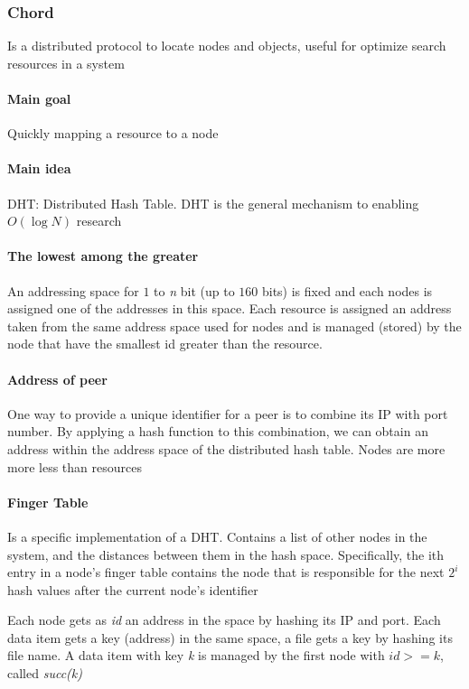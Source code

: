 \subsubsection{Chord}
Is a distributed protocol to locate nodes and objects, useful for optimize search resources in a system

\paragraph{Main goal}
Quickly mapping a resource to a node

\paragraph{Main idea}
DHT: Distributed Hash Table. DHT is the general mechanism to enabling $O(\log N)$ research

\paragraph{The lowest among the greater}
An addressing space for $1$ to \textit{n} bit (up to $160$ bits) is fixed and each nodes is assigned one of the addresses in this space. Each resource is assigned an address taken from the same address space used for nodes and is managed (stored) by the node that have the smallest id greater than the resource.

\paragraph{Address of peer}
One way to provide a unique identifier for a peer is to combine its IP with port number. By applying a hash function to this combination, we can obtain an address within the address space of the distributed hash table. Nodes are more more less than resources

\paragraph{Finger Table} 
Is a specific implementation of a DHT. Contains a list of other nodes in the system, and the distances between them in the hash space. Specifically, the ith entry in a node's finger table contains the node that is responsible for the next $2^i$ hash values after the current node's identifier

Each node gets as \textit{id} an address in the space by hashing its IP and port. Each data item gets a key (address) in the same space, a file gets a key by hashing its file name. A data item with key \textit{k} is managed by the first node with $id >= k$, called \textit{succ(k)}

